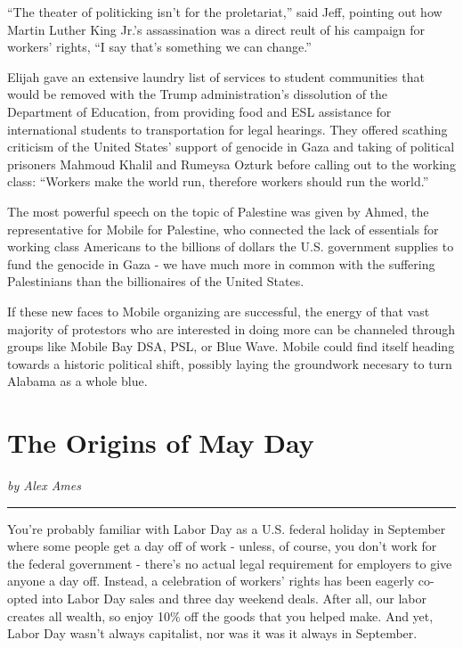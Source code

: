\documentclass[
]{book}
\begin{document}
``The theater of politicking isn't for the proletariat,'' said Jeff, pointing out how Martin Luther King Jr.'s assassination was a direct reult of his campaign for workers' rights, ``I say that's something we can change.''

Elijah gave an extensive laundry list of services to student communities that would be removed with the Trump administration's dissolution of the Department of Education, from providing food and ESL assistance for international students to transportation for legal hearings. They offered scathing criticism of the United States' support of genocide in Gaza and taking of political prisoners Mahmoud Khalil and Rumeysa Ozturk before calling out to the working class: ``Workers make the world run, therefore workers should run the world.''

The most powerful speech on the topic of Palestine was given by Ahmed, the representative for Mobile for Palestine, who connected the lack of essentials for working class Americans to the billions of dollars the U.S. government supplies to fund the genocide in Gaza - we have much more in common with the suffering Palestinians than the billionaires of the United States.

If these new faces to Mobile organizing are successful, the energy of that vast majority of protestors who are interested in doing more can be channeled through groups like Mobile Bay DSA, PSL, or Blue Wave. Mobile could find itself heading towards a historic political shift, possibly laying the groundwork necesary to turn Alabama as a whole blue.

\section*{The Origins of May Day}\label{the-origins-of-may-day}

\emph{by Alex Ames}

\begin{center}\rule{0.5\linewidth}{0.5pt}\end{center}

You're probably familiar with Labor Day as a U.S. federal holiday in September where some people get a day off of work - unless, of course, you don't work for the federal government - there's no actual legal requirement for employers to give anyone a day off. Instead, a celebration of workers' rights has been eagerly co-opted into Labor Day sales and three day weekend deals. After all, our labor creates all wealth, so enjoy 10\% off the goods that you helped make. And yet, Labor Day wasn't always capitalist, nor was it was it always in September.
\end{document}
